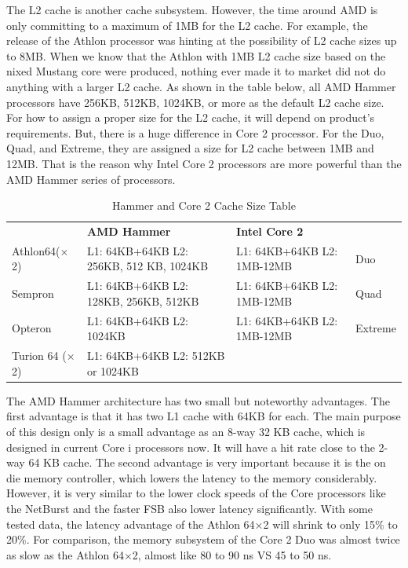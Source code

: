\documentclass[letterpaper,10pt,compsoc,draftclsnofoot,onecolumn]{IEEEtran}
\begin{document}
The L2 cache is another cache subsystem. However, the time around AMD is only committing to a maximum of 1MB for the L2 cache\cite{inside_amd_64}. For example, the release of the Athlon processor was hinting at the possibility of L2 cache sizes up to 8MB. When we know that the Athlon with 1MB L2 cache size based on the nixed Mustang\cite{inside_amd_64} core were produced, nothing ever made it to market did not do anything with a larger L2 cache. As shown in the table below, all AMD Hammer processors have 256KB, 512KB, 1024KB, or more as the default L2 cache size. For how to assign a proper size for the L2 cache, it will depend on product’s requirements. But, there is a huge difference in Core 2 processor. For the Duo, Quad, and Extreme, they are assigned a size for L2 cache between 1MB and 12MB. That is the reason why Intel Core 2 processors are more powerful than the AMD Hammer series of processors.

\begin{table}[!bhpt]
\captionsetup{justification=centering, aboveskip=2em, belowskip=0em}
\begin{tabularx}{\textwidth}{m{}m{}m{}m{}}
 & \textbf{AMD Hammer} & \textbf{Intel Core 2} &
\\
Athlon64($\times$2) & L1: 64KB+64KB L2: 256KB, 512 KB, 1024KB & L1: 64KB+64KB L2: 1MB-12MB & Duo
\\
Sempron & L1: 64KB+64KB L2: 128KB, 256KB, 512KB & L1: 64KB+64KB L2: 1MB-12MB & Quad
\\
Opteron & L1: 64KB+64KB L2: 1024KB & L1: 64KB+64KB L2: 1MB-12MB & Extreme
\\
Turion 64 ($\times$2) & L1: 64KB+64KB L2: 512KB or 1024KB & &
\end{tabularx}
\caption{Hammer and Core 2 Cache Size Table}
\end{table}

The AMD Hammer architecture has two small but noteworthy advantages. The first advantage is that it has two L1 cache with 64KB for each. The main purpose of this design only is a small advantage as an 8-way 32 KB cache, which is designed in current Core i processors now. It will have a hit rate close to the 2-way 64 KB cache. The second advantage is very important because it is the on die memory controller, which lowers the latency to the memory considerably\cite{pdf_amd_mem}. However, it is very similar to the lower clock speeds of the Core processors like the NetBurst and the faster FSB also lower latency significantly. With some tested data, the latency advantage of the Athlon 64×2 will shrink to only 15\% to 20\%. For comparison, the memory subsystem of the Core 2 Duo was almost twice as slow as the Athlon 64$\times$2, almost like 80 to 90 ns VS 45 to 50 ns.
\end{document}
